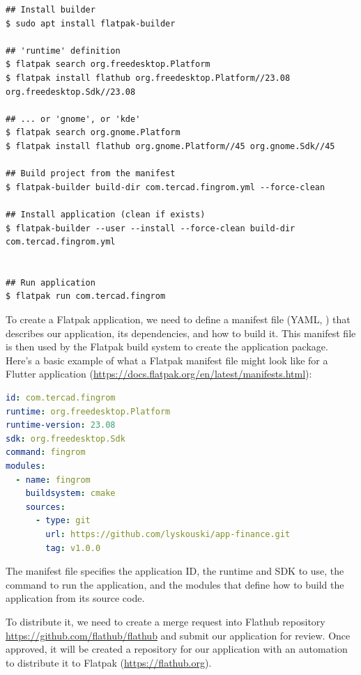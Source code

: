 \begin{lstlisting}[language=terminal]
## Install builder
$ sudo apt install flatpak-builder

## 'runtime' definition
$ flatpak search org.freedesktop.Platform
$ flatpak install flathub org.freedesktop.Platform//23.08 org.freedesktop.Sdk//23.08

## ... or 'gnome', or 'kde'
$ flatpak search org.gnome.Platform
$ flatpak install flathub org.gnome.Platform//45 org.gnome.Sdk//45

## Build project from the manifest
$ flatpak-builder build-dir com.tercad.fingrom.yml --force-clean

## Install application (clean if exists)
$ flatpak-builder --user --install --force-clean build-dir com.tercad.fingrom.yml


## Run application
$ flatpak run com.tercad.fingrom
\end{lstlisting}

\noindent To create a Flatpak application, we need to define a manifest file (YAML, ) that
describes our application, its dependencies, and how to build it. This manifest file is then used by the Flatpak build
system to create the application package. Here's a basic example of what a Flatpak manifest file might look like for a
Flutter application (\href{https://docs.flatpak.org/en/latest/manifests.html}{https://docs.flatpak.org/en/latest/manifests.html}):

\begin{lstlisting}[language=yaml]
id: com.tercad.fingrom
runtime: org.freedesktop.Platform
runtime-version: 23.08
sdk: org.freedesktop.Sdk
command: fingrom
modules:
  - name: fingrom
    buildsystem: cmake
    sources:
      - type: git
        url: https://github.com/lyskouski/app-finance.git
        tag: v1.0.0
\end{lstlisting}

\noindent The manifest file specifies the application ID, the runtime and SDK to use, the command to run the application,
and the modules that define how to build the application from its source code.

To distribute it, we need to create a merge request into Flathub repository
\href{https://github.com/flathub/flathub}{https://github.com/flathub/flathub}
and submit our application for review. Once approved, it will be created a repository for our application with an
automation to distribute it to Flatpak (\href{https://flathub.org}{https://flathub.org}).


